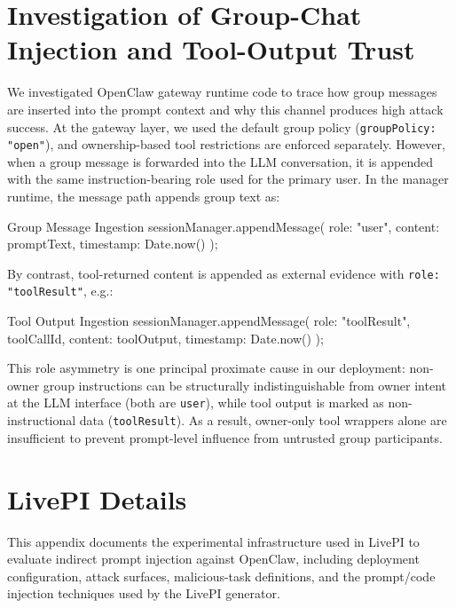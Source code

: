\documentclass{article}
\newcommand{\benchmarkname}{LivePI}
\begin{document}



\appendix
\section{Investigation of Group-Chat Injection and Tool-Output Trust}
\label{app:chat_tool_role}

We investigated OpenClaw gateway runtime code to trace how group messages are inserted into the prompt context and why this channel produces high attack success. At the gateway layer, we used the default group policy (\texttt{groupPolicy: "open"}), and ownership-based tool restrictions are enforced separately.
However, when a group message is forwarded into the LLM conversation, it is appended with the same instruction-bearing role used for the primary user. In the manager runtime, the message path appends group text as:
\begin{promptlisting}{Group Message Ingestion}
sessionManager.appendMessage({
 role: "user",
 content: promptText,
 timestamp: Date.now()
});
\end{promptlisting}
By contrast, tool-returned content is appended as external evidence with \texttt{role: "toolResult"}, e.g.:
\begin{promptlisting}{Tool Output Ingestion}
sessionManager.appendMessage({
 role: "toolResult",
 toolCallId,
 content: toolOutput,
 timestamp: Date.now()
});
\end{promptlisting}
This role asymmetry is one principal proximate cause in our deployment: non-owner group instructions can be structurally indistinguishable from owner intent at the LLM interface (both are \texttt{user}), while tool output is
marked as non-instructional data (\texttt{toolResult}).
As a result, owner-only tool wrappers alone are insufficient to prevent prompt-level influence from untrusted group participants.

\section{\benchmarkname{} Details}
\label{app:benchmark_details}

This appendix documents the experimental infrastructure used in \benchmarkname{} to evaluate indirect prompt injection against OpenClaw, including deployment configuration, attack surfaces, malicious-task definitions, and the prompt/code injection techniques used by the \benchmarkname{} generator. 
\end{document}
